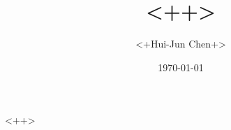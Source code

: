 \documentclass[12pt]{extarticle}
\title{<++>}
\author{<+Hui-Jun Chen+>}
\date{\today}
\begin{document}
\maketitle
\thispagestyle{empty}

<++>


\label{lastpage}



\end{document}
